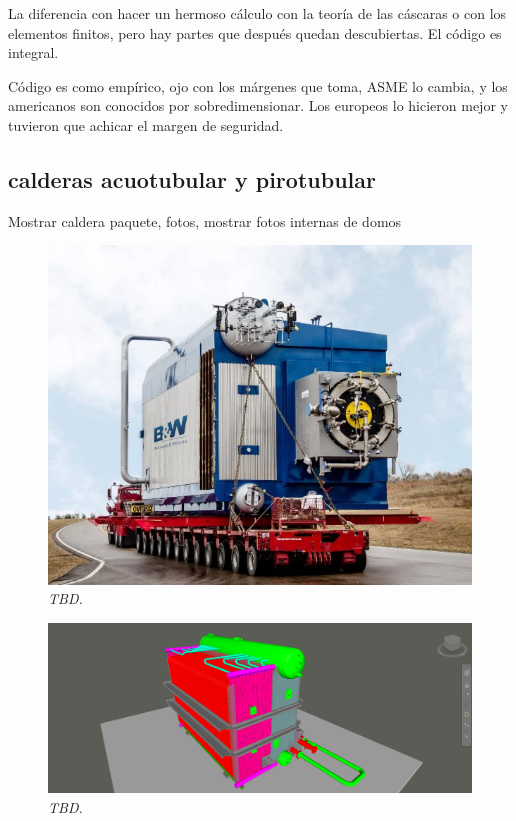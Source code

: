 La diferencia con hacer un hermoso cálculo con la teoría de las cáscaras o con los elementos finitos, pero hay partes que después quedan descubiertas. El código es integral.

Código es como empírico, ojo con los márgenes que toma, ASME lo cambia, y los americanos son conocidos por sobredimensionar. Los europeos lo hicieron mejor y tuvieron que achicar el margen de seguridad.

\subsection{calderas acuotubular y pirotubular}
Mostrar caldera paquete, fotos, mostrar fotos internas de domos


\begin{figure}[ht]
    \centerline{\includegraphics[scale=0.6]{b_w_boiler_01.png}}
    \caption{\textit{TBD.}}
    \label{im:b_w_boiler_01}
\end{figure}

\begin{figure}[ht]
    \centerline{\includegraphics[scale=0.2]{b_w_boiler_02.png}}
    \caption{\textit{TBD.}}
    \label{im:b_w_boiler_02}
\end{figure}

